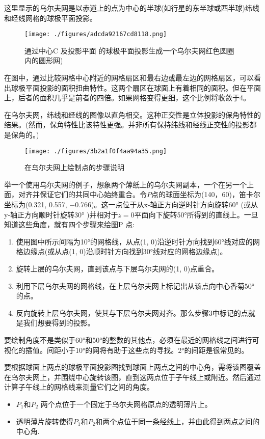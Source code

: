 这里显示的乌尔夫网是以赤道上的点为中心的半球(如行星的东半球或西半球)纬线和经线网格的球极平面投影。
\begin{figure}[ht]
\centering
\texttt{[image: ./figures/adcda92167cd8118.png]}
\caption{通过中心C 及投影平面 的球极平面投影生成一个乌尔夫网红色圆圈内的圆形网)} \label{fig_QJPMTY_11}
\end{figure}
在图中，通过比较网格中心附近的网格扇区和最右边或最左边的网格扇区，可以看出球极平面投影的面积扭曲特性。这两个扇区在球面上有着相同的面积。但在平面上，后者的面积几乎是前者的四倍。如果网格变得更细，这个比例将收敛于4。

在乌尔夫网，纬线和经线的图像以直角相交。这种正交性是立体投影的保角特性的结果。(然而，保角特性比该特性更强。并非所有保持纬线和经线正交性的投影都是保角的。)
\begin{figure}[ht]
\centering
\texttt{[image: ./figures/3b2a1f0f4aa94a35.png]}
\caption{在乌尔夫网上绘制点的步骤说明} \label{fig_QJPMTY_12}
\end{figure}
举一个使用乌尔夫网的例子，想象两个薄纸上的乌尔夫网副本，一个在另一个上面，对齐并保证它们的共同中心始终重合。令$P$点的球面坐标为(140，60)，笛卡尔坐标为(0.321, 0.557, −0.766)。这一点位于从x-轴正方向逆时针方向旋转60° (或从y-轴正方向顺时针旋转30° )并相对于$z = 0$平面向下旋转50°所得到的直线上。一旦知道这些角度，就有四个步骤来绘图P 点:
\begin{enumerate}
\item 使用图中所示间隔为10°的网格线，从点(1, 0)沿逆时针方向找到60°线对应的网格边缘点(或从点(1, 0)沿顺时针方向找到30°线对应的网格边缘点)。
\item 旋转上层的乌尔夫网，直到该点与下层乌尔夫网的(1, 0)点重合。
\item 利用下层乌尔夫网的网格线，在上层乌尔夫网上标记出从该点向中心香菊50°的点。
\item 反向旋转上层乌尔夫网，使其与下层乌尔夫网对齐。那么步骤3中标记的点就是我们想要得到的投影。
\end{enumerate}
要绘制角度不是类似于60°和50°的整数的其他点，必须在最近的网格线之间进行可视化的插值。间距小于10°的网将有助于这些点的寻找。2°的间距是很常见的。

要根据球面上两点的球极平面投影图找到球面上两点之间的中心角，需将该图覆盖在乌尔夫网上，并围绕中心旋转该图，直到这两点位于子午线上或附近。然后通过计算子午线上的网格线来测量它们之间的角度。
\begin{itemize}
\item $P_1$和$P_2$ 两个点位于一个固定于乌尔夫网格原点的透明薄片上。

\item 透明薄片旋转使得$P_1$和$P_2$和两个点位于同一条经线上，并由此得到两点之间的中心角.
\end{itemize}
